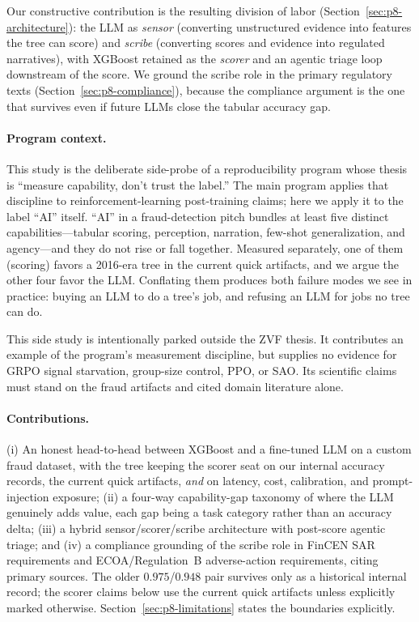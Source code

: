 \documentclass{article}
\providecommand{\secref}[1]{Section~\ref{#1}}
\begin{document}
Our constructive contribution is the resulting division of labor
(\secref{sec:p8-architecture}): the LLM as \emph{sensor} (converting
unstructured evidence into features the tree can score) and \emph{scribe}
(converting scores and evidence into regulated narratives), with XGBoost
retained as the \emph{scorer} and an agentic triage loop downstream of the
score. We ground the scribe role in the primary regulatory texts
(\secref{sec:p8-compliance}), because the compliance argument is the one that
survives even if future LLMs close the tabular accuracy gap.

\paragraph{Program context.} This study is the deliberate side-probe of a
reproducibility program whose thesis is ``measure capability, don't trust the
label.'' The main program applies that discipline to reinforcement-learning
post-training claims; here we apply it to the label ``AI'' itself. ``AI'' in a
fraud-detection pitch bundles at least five distinct capabilities---tabular
scoring, perception, narration, few-shot generalization, and agency---and they
do not rise or fall together. Measured separately, one of them (scoring)
favors a 2016-era tree in the current quick artifacts, and we argue the other four
favor the LLM. Conflating them produces both failure
modes we see in practice: buying an LLM to do a tree's job, and refusing an LLM
for jobs no tree can do.

This side study is intentionally parked outside the ZVF thesis. It contributes
an example of the program's measurement discipline, but supplies no evidence for
GRPO signal starvation, group-size control, PPO, or SAO. Its scientific claims
must stand on the fraud artifacts and cited domain literature alone.

\paragraph{Contributions.}
(i) An honest head-to-head between XGBoost and a fine-tuned LLM on a custom
fraud dataset, with the tree keeping the scorer seat on our internal accuracy
records, the current quick artifacts, \emph{and} on
latency, cost, calibration, and prompt-injection exposure;
(ii) a four-way capability-gap taxonomy of where the LLM genuinely adds value,
each gap being a task category rather than an accuracy delta;
(iii) a hybrid sensor/scorer/scribe architecture with post-score agentic
triage; and
(iv) a compliance grounding of the scribe role in FinCEN SAR requirements and
ECOA/Regulation~B adverse-action requirements, citing primary sources.
The older $0.975$/$0.948$ pair survives only as a historical internal record;
the scorer claims below use the current quick artifacts unless explicitly
marked otherwise. \secref{sec:p8-limitations} states the boundaries
explicitly.
\end{document}
